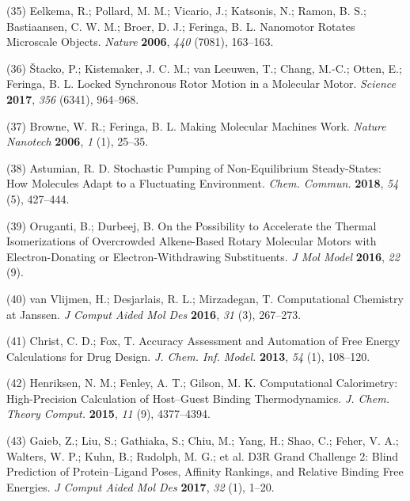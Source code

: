 \documentclass[11pt,notitlepage]{article}
\begin{document}
\leavevmode\hypertarget{ref-thFGBz32}{}%
(35) Eelkema, R.; Pollard, M. M.; Vicario, J.; Katsonis, N.; Ramon, B.
S.; Bastiaansen, C. W. M.; Broer, D. J.; Feringa, B. L. Nanomotor
Rotates Microscale Objects. \emph{Nature} \textbf{2006}, \emph{440}
(7081), 163--163.

\leavevmode\hypertarget{ref-mKSNFvW7}{}%
(36) Štacko, P.; Kistemaker, J. C. M.; van Leeuwen, T.; Chang, M.-C.;
Otten, E.; Feringa, B. L. Locked Synchronous Rotor Motion in a Molecular
Motor. \emph{Science} \textbf{2017}, \emph{356} (6341), 964--968.

\leavevmode\hypertarget{ref-10FsKpWBI}{}%
(37) Browne, W. R.; Feringa, B. L. Making Molecular Machines Work.
\emph{Nature Nanotech} \textbf{2006}, \emph{1} (1), 25--35.

\leavevmode\hypertarget{ref-qhUBHBOM}{}%
(38) Astumian, R. D. Stochastic Pumping of Non-Equilibrium
Steady-States: How Molecules Adapt to a Fluctuating Environment.
\emph{Chem. Commun.} \textbf{2018}, \emph{54} (5), 427--444.

\leavevmode\hypertarget{ref-1AzLiBVkC}{}%
(39) Oruganti, B.; Durbeej, B. On the Possibility to Accelerate the
Thermal Isomerizations of Overcrowded Alkene-Based Rotary Molecular
Motors with Electron-Donating or Electron-Withdrawing Substituents.
\emph{J Mol Model} \textbf{2016}, \emph{22} (9).

\leavevmode\hypertarget{ref-1FiDpP1LR}{}%
(40) van Vlijmen, H.; Desjarlais, R. L.; Mirzadegan, T. Computational
Chemistry at Janssen. \emph{J Comput Aided Mol Des} \textbf{2016},
\emph{31} (3), 267--273.

\leavevmode\hypertarget{ref-1BwXH3GFO}{}%
(41) Christ, C. D.; Fox, T. Accuracy Assessment and Automation of Free
Energy Calculations for Drug Design. \emph{J. Chem. Inf. Model.}
\textbf{2013}, \emph{54} (1), 108--120.

\leavevmode\hypertarget{ref-1935a9V0d}{}%
(42) Henriksen, N. M.; Fenley, A. T.; Gilson, M. K. Computational
Calorimetry: High-Precision Calculation of Host--Guest Binding
Thermodynamics. \emph{J. Chem. Theory Comput.} \textbf{2015}, \emph{11}
(9), 4377--4394.

\leavevmode\hypertarget{ref-LWd10vQy}{}%
(43) Gaieb, Z.; Liu, S.; Gathiaka, S.; Chiu, M.; Yang, H.; Shao, C.;
Feher, V. A.; Walters, W. P.; Kuhn, B.; Rudolph, M. G.; et al. D3R Grand
Challenge 2: Blind Prediction of Protein--Ligand Poses, Affinity
Rankings, and Relative Binding Free Energies. \emph{J Comput Aided Mol
Des} \textbf{2017}, \emph{32} (1), 1--20.
\end{document}
